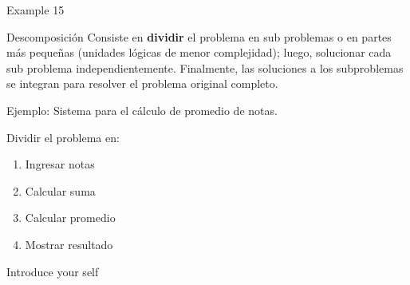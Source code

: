 \documentclass[aspectratio=169]{beamer}
\renewcommand{\alert}[1]{\textbf{\color{swufe}#1}}
\newcommand{\alertplain}[1]{{\color{swufe}#1}}
\begin{document}
    \begin{frame}{Example 15}
        \begin{exampleblock}{Descomposición}
            Consiste en \alert{dividir} el problema en sub problemas o en partes más pequeñas (unidades lógicas de menor complejidad); luego, solucionar cada sub problema independientemente. Finalmente, las soluciones a los subproblemas se integran para resolver el problema original completo. \\
        \end{exampleblock}

        \alertplain{Ejemplo:} Sistema para el cálculo de promedio de notas. \newline

        Dividir el problema en:
        \begin{enumerate}
            \item Ingresar notas
            \item Calcular suma
            \item Calcular promedio
            \item Mostrar resultado
        \end{enumerate}

        \begin{note}
            {Introduce your self}
        \end{note}
    \end{frame}
\end{document}
